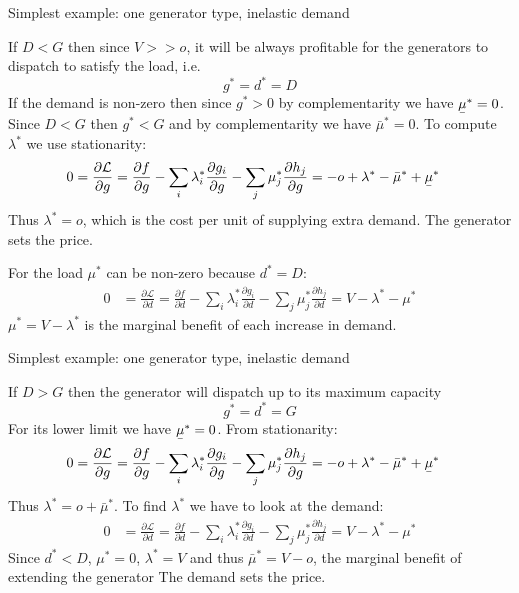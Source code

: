 \documentclass[10pt,dvipsnames]{beamer}
\def\l{\lambda}
\def\m{\mu}
\def\d{\partial}
\def\cL{\mathcal{L}}
\newcommand{\ubar}[1]{\text{\b{$#1$}}}
\begin{document}
\begin{frame}{Simplest example: one generator type, inelastic demand}

  If $D < G$ then since $V >> o$, it will be always profitable for the
  generators to dispatch to satisfy the load, i.e.
  \begin{equation*}
    g^* = d^* = D
  \end{equation*}
  If the demand is non-zero then since $g^* > 0$ by complementarity we
  have $\ubar{\m}^* = 0$. Since $D < G$ then $g^* < G$ and
  by complementarity we have $\bar{\m}^* = 0$. To compute $\l^*$ we use stationarity:
  \begin{align*}
    0 & = \frac{\d \cL}{\d g } =   \frac{\d f}{\d g} - \sum_i \l_i^* \frac{\d g_i}{\d g}  - \sum_j \m_j^* \frac{\d h_j}{\d g} = - o + \l^* - \bar{\m}^* + \ubar{\m}^*
  \end{align*}
  Thus $\l^* = o$, which is the cost per unit of supplying extra demand. The \alert{generator sets the price}.

  For the load $\m^*$ can be non-zero because $d^*=D$:
    \begin{align*}
      0 & = \frac{\d \cL}{\d d} =   \frac{\d f}{\d d} - \sum_i \l_i^* \frac{\d g_i}{\d d}  - \sum_j \m_j^* \frac{\d h_j}{\d d} = V - \l^* - \m^*
    \end{align*}
    $\m^* = V - \l^*$ is the marginal benefit of each increase in demand.
\end{frame}


\begin{frame}{Simplest example: one generator type, inelastic demand}

  If $D > G$ then the generator will dispatch up to its maximum capacity
  \begin{equation*}
    g^* = d^* = G
  \end{equation*}
  For its lower limit we have $\ubar{\m}^* = 0$. From stationarity:
  \begin{align*}
    0 & = \frac{\d \cL}{\d g } =   \frac{\d f}{\d g} - \sum_i \l_i^* \frac{\d g_i}{\d g}  - \sum_j \m_j^* \frac{\d h_j}{\d g} = - o + \l^* - \bar{\m}^* + \ubar{\m}^*
  \end{align*}
  Thus $\l^* = o + \bar{\m}^*$. To find $\l^*$ we have to look at the demand:
    \begin{align*}
      0 & = \frac{\d \cL}{\d d} =   \frac{\d f}{\d d} - \sum_i \l_i^* \frac{\d g_i}{\d d}  - \sum_j \m_j^* \frac{\d h_j}{\d d} = V - \l^* - \m^*
    \end{align*}
  Since $d^* < D$, $\m^* = 0$, $\l^* = V$ and thus $\bar{\m}^* = V-o$, the marginal benefit of extending the generator The \alert{demand sets the price}.

\end{frame}
\end{document}
